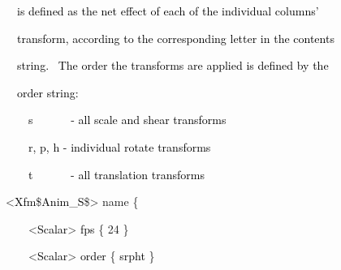 \documentclass[a4paper]{article}
\newcommand\textstyleOOoComputerKeyWord[1]{\textrm{\textcolor[rgb]{0.0,0.0,0.5019608}{#1}}}
\newcommand\textstyleOOoAssemblerSpecialChar[1]{\textrm{\textcolor[rgb]{0.0,0.5019608,0.0}{#1}}}
\newcommand\textstyleOOoAssemblerIdent[1]{\textrm{\textcolor{black}{#1}}}
\newcommand\textstyleOOoAssemblerDirective[1]{\textrm{\textcolor[rgb]{0.0,0.5019608,1.0}{#1}}}
\newcommand\textstyleOOoAssemblerLiteral[1]{\textrm{\textcolor[rgb]{0.49803922,0.0,0.49803922}{#1}}}
\begin{document}
{\color{black}
\textstyleOOoComputerKeyWord{\textcolor{black}{\ \ \ \ is defined as the net effect of each of the individual
columns'}}}

{\color{black}
\textstyleOOoComputerKeyWord{\textcolor{black}{\ \ \ \ transform, according to the corresponding letter in the
contents}}}

{\color{black}
\textstyleOOoComputerKeyWord{\textcolor{black}{\ \ \ \ string. \ The order the transforms are applied is defined by
the}}}

{\color{black}
\textstyleOOoComputerKeyWord{\textcolor{black}{\ \ \ \ order string:}}}


\bigskip

{\color{black}
\textstyleOOoComputerKeyWord{\textcolor{black}{\ \ \ \ \ \ s \ \ \ \ \ \ {}- all scale and shear transforms}}}

{\color{black}
\textstyleOOoComputerKeyWord{\textcolor{black}{\ \ \ \ \ \ r, p, h - individual rotate transforms}}}

{\color{black}
\textstyleOOoComputerKeyWord{\textcolor{black}{\ \ \ \ \ \ t \ \ \ \ \ \ {}- all translation transforms}}}


\bigskip


\bigskip

{\color{black}
\textstyleOOoComputerKeyWord{\textcolor{black}{\ \ }}\textstyleOOoAssemblerSpecialChar{{\textless}}\textstyleOOoAssemblerIdent{Xfm}\textstyleOOoAssemblerSpecialChar{\$}\textstyleOOoAssemblerIdent{Anim\_S}\textstyleOOoAssemblerSpecialChar{\${\textgreater}}\textstyleOOoComputerKeyWord{\textcolor{black}{
}}\textstyleOOoAssemblerDirective{name}\textstyleOOoComputerKeyWord{\textcolor{black}{
}}\textstyleOOoAssemblerSpecialChar{\{}}

{\color{black}
\textstyleOOoComputerKeyWord{\textcolor{black}{\ \ \ \ \ \ }}\textstyleOOoAssemblerSpecialChar{{\textless}}\textstyleOOoAssemblerIdent{Scalar}\textstyleOOoAssemblerSpecialChar{{\textgreater}}\textstyleOOoComputerKeyWord{\textcolor{black}{
}}\textstyleOOoAssemblerIdent{fps}\textstyleOOoComputerKeyWord{\textcolor{black}{
}}\textstyleOOoAssemblerSpecialChar{\{}\textstyleOOoComputerKeyWord{\textcolor{black}{
}}\textstyleOOoAssemblerLiteral{24}\textstyleOOoComputerKeyWord{\textcolor{black}{
}}\textstyleOOoAssemblerSpecialChar{\}}}

{\color{black}
\textstyleOOoComputerKeyWord{\textcolor{black}{\ \ \ \ \ \ }}\textstyleOOoAssemblerSpecialChar{{\textless}}\textstyleOOoAssemblerIdent{Scalar}\textstyleOOoAssemblerSpecialChar{{\textgreater}}\textstyleOOoComputerKeyWord{\textcolor{black}{
}}\textstyleOOoAssemblerIdent{order}\textstyleOOoComputerKeyWord{\textcolor{black}{
}}\textstyleOOoAssemblerSpecialChar{\{}\textstyleOOoComputerKeyWord{\textcolor{black}{
}}\textstyleOOoAssemblerIdent{srpht}\textstyleOOoComputerKeyWord{\textcolor{black}{
}}\textstyleOOoAssemblerSpecialChar{\}}}
\end{document}
